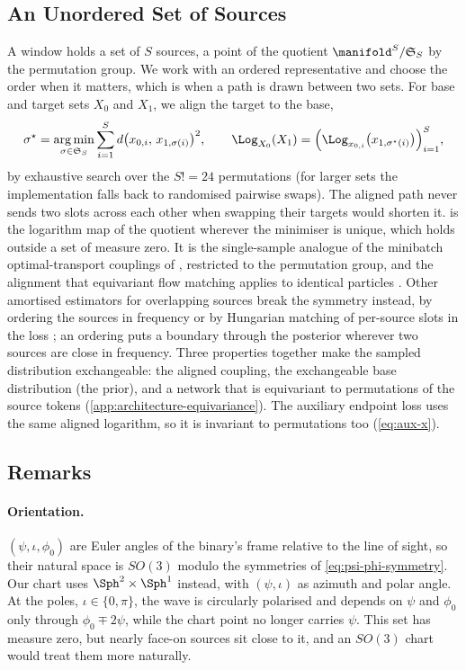 \subsection{An Unordered Set of Sources}
\label{app:geometry-set}

A window holds a set of $S$ sources, a point of the quotient $\manifold^S/\mathfrak S_S$ by the
permutation group. We work with an ordered representative and choose the order when it
matters, which is when a path is drawn between two sets. For base and target sets $X_0$ and
$X_1$, we align the target to the base,
\begin{equation}
  \sigma^\star = \operatorname*{arg\,min}_{\sigma\in\mathfrak S_S}
  \sum_{i=1}^{S} d\bigl(x_{0,i},\, x_{1,\sigma(i)}\bigr)^2,
  \qquad
  \Log_{X_0}(X_1) = \Bigl(\Log_{x_{0,i}}\bigl(x_{1,\sigma^\star(i)}\bigr)\Bigr)_{i=1}^{S},
  \label{eq:set-log}
\end{equation}
by exhaustive search over the $S!=24$ permutations (for larger sets the implementation falls
back to randomised pairwise swaps). The aligned path never sends two slots across each other
when swapping their targets would shorten it.  is the logarithm map of the
quotient wherever the minimiser is unique, which holds outside a set of measure zero. It is
the single-sample analogue of the minibatch optimal-transport couplings of
\citet{tong2024improving}, restricted to the permutation group, and the alignment that
equivariant flow matching applies to identical particles \citep{klein2023equivariant}. Other
amortised estimators for overlapping sources break the symmetry instead, by ordering the sources
in frequency \citep{delmond2026neural} or by Hungarian matching of per-source slots in the loss
\citep{houba2025slotflow}; an ordering puts a boundary through the posterior wherever two
sources are close in frequency. Three properties together
make the sampled distribution exchangeable: the aligned coupling, the exchangeable base
distribution (the prior), and a network that is equivariant to permutations of the source
tokens (\cref{app:architecture-equivariance}). The auxiliary endpoint loss uses the same
aligned logarithm, so it is invariant to permutations too (\cref{eq:aux-x}).

\subsection{Remarks}
\label{app:geometry-remarks}

\paragraph{Orientation.}
$(\psi,\iota,\phi_0)$ are Euler angles of the binary's frame relative to the line of sight, so
their natural space is $SO(3)$ modulo the symmetries of \cref{eq:psi-phi-symmetry}. Our chart
uses $\Sph^2\times\Sph^1$ instead, with $(\psi,\iota)$ as azimuth and polar angle. At the poles,
$\iota\in\{0,\pi\}$, the wave is circularly polarised and depends on $\psi$ and $\phi_0$ only
through $\phi_0\mp2\psi$, while the chart point no longer carries $\psi$. This set has
measure zero, but nearly face-on sources sit close to it, and an $SO(3)$ chart would treat
them more naturally.

